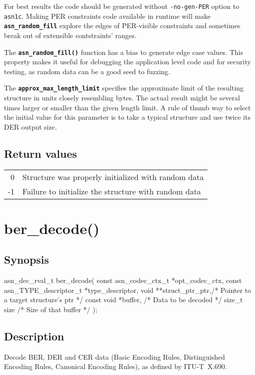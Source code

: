 \documentclass[english,oneside,12pt]{book}
\newcommand{\apisection}[2]{\clearpage\section{\label{#1}#2}}
\newcommand{\code}[1]{\texttt{\textbf{\lstinline{#1}}}}
\newcommand{\cmd}[1]{\texttt{#1}}
\begin{document}
For best results the code should be generated without \cmd{-no-gen-PER}
option to \cmd{asn1c}. Making PER constraints code available in runtime
will make \code{asn_random_fill} explore the edges of PER-visible constraints
and sometimes break out of extensible contstraints' ranges.

The \code{asn_random_fill()} function has a bias to generate edge case
values. This property makes it useful for debugging the application level
code and for security testing, as random data can be a good seed to fuzzing.

The \code{approx_max_length_limit} specifies the approximate limit of the
resulting structure in units closely resembling bytes. The actual result
might be several times larger or smaller than the given length limit.
A rule of thumb way to select the initial value for this parameter
is to take a typical structure and use twice its DER output size.

\subsection*{Return values}

\begin{tabular}[h!]{rl}
0 & Structure was properly initialized with random data \\
-1 & Failure to initialize the structure with random data
\end{tabular}

\apisection{sec:ber_decode}{ber\_decode()}

\subsection*{Synopsis}
\begin{signature}
asn_dec_rval_t ber_decode(
    const asn_codec_ctx_t *opt_codec_ctx,
    const asn_TYPE_descriptor_t *type_descriptor,
    void **struct_ptr_ptr,/* Pointer to a target structure's ptr */
    const void *buffer,   /* Data to be decoded */
    size_t size           /* Size of that buffer */
);
\end{signature}

\subsection*{Description}

Decode BER, DER and CER data
(Basic Encoding Rules, Distinguished Encoding Rules, Canonical Encoding Rules),
as defined by ITU-T~X.690.
\end{document}

